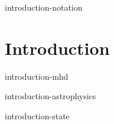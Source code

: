 \tableofcontents

 {introduction-notation}

\chapter{Introduction}
\setcounter{page}{1}

 {introduction-mhd}

 {introduction-astrophysics}

 {introduction-state}
